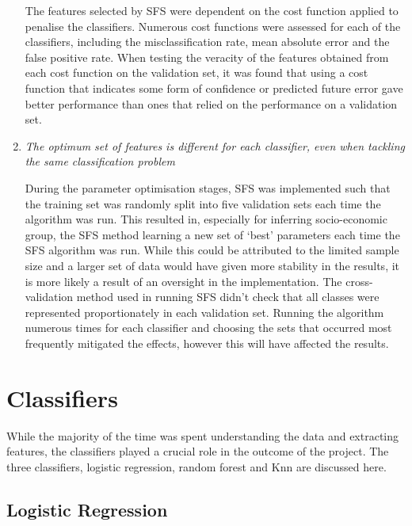 \begin{enumerate}
The features selected by SFS were dependent on the cost function applied to penalise the classifiers.  Numerous cost functions were assessed for each of the classifiers, including the misclassification rate, mean absolute error and the false positive rate. When testing the veracity of the features obtained from each cost function on the validation set, it was found that using a cost function that indicates some form of confidence or predicted future error gave better performance than ones that relied on the performance on a validation set.


\item \textit{The optimum set of features is different for each classifier, even when tackling the same classification problem}

During the parameter optimisation stages, SFS was implemented such that the training set was randomly split into five validation sets each time the algorithm was run. This resulted in, especially for inferring socio-economic group, the SFS method learning a new set of `best' parameters each time the SFS algorithm was run. While this could be attributed to the limited sample size and a larger set of data would have given more stability in the results, it is more likely a result of an oversight in the implementation. The cross-validation method used in running SFS didn't check that all classes were represented proportionately in each validation set. Running the algorithm numerous times for each classifier and choosing the sets that occurred most frequently mitigated the effects, however this will have affected the results. 
\end{enumerate}

\section{Classifiers}

While the majority of the time was spent understanding the data and extracting features, the classifiers played a crucial role in the outcome of the project.  The three classifiers, logistic regression, random forest and Knn are discussed here.

\subsection{Logistic Regression}

